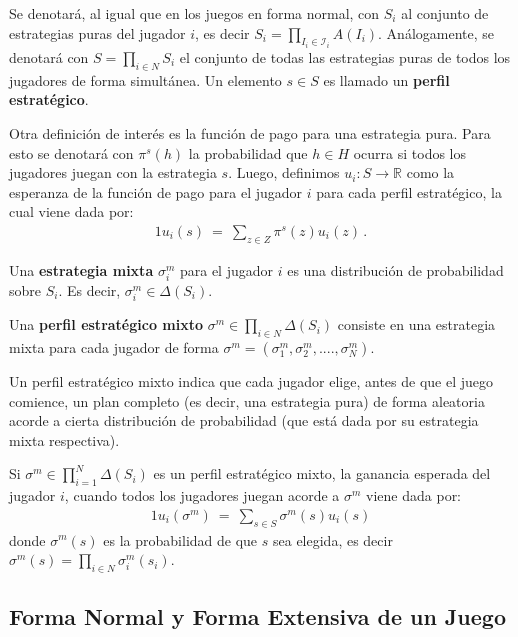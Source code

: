 Se denotará, al igual que en los juegos en forma normal, con $S_i$ al conjunto de estrategias puras del jugador $i$, es decir $S_i=\prod_{I_i \in \mathcal{I}_i} A(I_i)$. Análogamente, se denotará con $S = \prod_{i \in N} S_i$ el conjunto de todas las estrategias puras de todos los jugadores de forma simultánea. Un elemento $s \in S$ es llamado un \textbf{perfil estratégico}.

Otra definición de interés es la función de pago para una estrategia pura. Para esto se denotará con $\pi^s(h)$ la probabilidad que $h \in H $ ocurra si todos los jugadores juegan con la estrategia $s$. Luego, definimos $u_i : S \rightarrow \mathbb{R}$ como la esperanza de la función de pago para el jugador $i$ para cada perfil estratégico, la cual viene dada por:
\begin{alignat}{1}
\label{eq:funcion-pago-fe}
u_i(s)\ =\ \sum_{z \in Z} \pi^s(z) u_i(z) \,.
\end{alignat} 

\begin{definition}
\label{def:estrategia-mixta-fe}
Una \textbf{estrategia mixta} $\sigma^m_i$ para el jugador $i$ es una distribución de probabilidad sobre $S_i$. Es decir, $\sigma_i^m \in \Delta(S_i)$.
\end{definition}

\begin{definition}
Una \textbf{perfil estratégico mixto} $\sigma^m \in \prod_{i \in N} \Delta(S_i)$ consiste en una estrategia mixta para cada jugador de forma $\sigma^m = (\sigma_1^m, \sigma_2^m, ...., \sigma_N^m)$.
\end{definition}

Un perfil estratégico mixto indica que cada jugador elige, antes de que el juego comience, un plan completo (es decir, una estrategia pura) de forma aleatoria acorde a cierta distribución de probabilidad (que está dada por su estrategia mixta respectiva).

Si $\sigma^m \in \prod_{i = 1}^N \Delta(S_i)$ es un perfil estratégico mixto, la ganancia esperada del jugador $i$, cuando todos los jugadores juegan acorde a $\sigma^m$ viene dada por:
\begin{alignat}{1}
u_i(\sigma^m)\ =\ \sum_{s \in S} \sigma^m(s)u_i(s)
\end{alignat}
donde $\sigma^m(s)$ es la probabilidad de que $s$ sea elegida, es decir $\sigma^m(s) = \prod_{i \in N} \sigma_i^m(s_i)$.

\subsection{Forma Normal y Forma Extensiva de un Juego}
\label{section:normal-extensiva}

